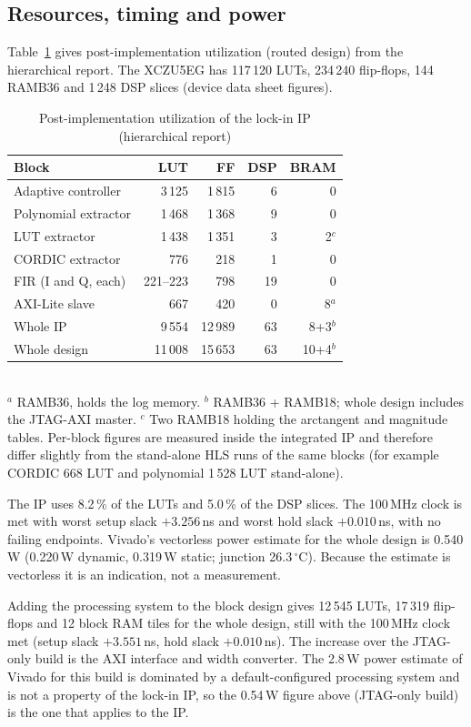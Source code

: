 \documentclass[journal]{IEEEtran}
\begin{document}
\subsection{Resources, timing and power}
Table~\ref{tab:res} gives post-implementation utilization (routed design) from the hierarchical report. The XCZU5EG has 117\,120 LUTs, 234\,240 flip-flops, 144 RAMB36 and 1\,248 DSP slices (device data sheet figures).
\begin{table}[t]\centering\caption{Post-implementation utilization of the lock-in IP (hierarchical report)}\label{tab:res}
\begin{tabular}{@{}lrrrr@{}}\toprule
Block & LUT & FF & DSP & BRAM\\\midrule
Adaptive controller & 3\,125 & 1\,815 & 6 & 0\\
Polynomial extractor & 1\,468 & 1\,368 & 9 & 0\\
LUT extractor & 1\,438 & 1\,351 & 3 & 2$^{c}$\\
CORDIC extractor & 776 & 218 & 1 & 0\\
FIR (I and Q, each) & 221--223 & 798 & 19 & 0\\
AXI-Lite slave & 667 & 420 & 0 & 8$^{a}$\\\midrule
Whole IP & 9\,554 & 12\,989 & 63 & 8+3$^{b}$\\
Whole design & 11\,008 & 15\,653 & 63 & 10+4$^{b}$\\\bottomrule
\end{tabular}\\[2pt]
{\scriptsize $^{a}$ RAMB36, holds the log memory. $^{b}$ RAMB36 + RAMB18; whole design includes the JTAG-AXI master. $^{c}$ Two RAMB18 holding the arctangent and magnitude tables. Per-block figures are measured inside the integrated IP and therefore differ slightly from the stand-alone HLS runs of the same blocks (for example CORDIC 668 LUT and polynomial 1\,528 LUT stand-alone).}
\end{table}
The IP uses 8.2\,\% of the LUTs and 5.0\,\% of the DSP slices. The 100\,MHz clock is met with worst setup slack $+3.256$\,ns and worst hold slack $+0.010$\,ns, with no failing endpoints. Vivado's vectorless power estimate for the whole design is 0.540\,W (0.220\,W dynamic, 0.319\,W static; junction 26.3\,$^\circ$C). Because the estimate is vectorless it is an indication, not a measurement.

Adding the processing system to the block design gives 12\,545 LUTs, 17\,319 flip-flops and 12 block RAM tiles for the whole design, still with the 100\,MHz clock met (setup slack $+3.551$\,ns, hold slack $+0.010$\,ns). The increase over the JTAG-only build is the AXI interface and width converter. The 2.8\,W power estimate of Vivado for this build is dominated by a default-configured processing system and is not a property of the lock-in IP, so the 0.54\,W figure above (JTAG-only build) is the one that applies to the IP.
\end{document}
